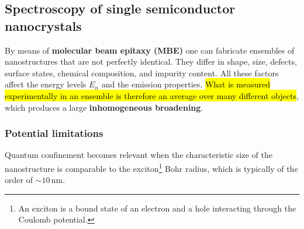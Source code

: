 
\subsection{Spectroscopy of single semiconductor nanocrystals}
By means of \textbf{molecular beam epitaxy (MBE)} one can fabricate ensembles of nanostructures that are not perfectly identical. They differ in shape, size, defects, surface states, chemical composition, and impurity content. All these factors affect the energy levels $E_n$ and the emission properties. \hl{What is measured experimentally in an ensemble is therefore an average over many different objects}, which produces a large \textbf{inhomogeneous broadening}.


\subsubsection{Potential limitations}

Quantum confinement becomes relevant when the characteristic size of the nanostructure is comparable to the exciton\footnote{An exciton is a bound state of an electron and a hole interacting through the Coulomb potential.} Bohr radius, which is typically of the order of $\sim 10\,\mathrm{nm}$.

